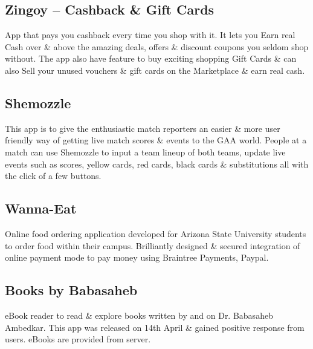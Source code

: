 \documentclass[]{deedy-resume-openfont}
\begin{document}
\begin{minipage}[t]{0.66\textwidth}
\sectionsep

\subsection{Zingoy – Cashback \& Gift Cards}
App that pays you cashback every time you shop with it. It lets you Earn real Cash over \& above the amazing deals, offers \& discount coupons you seldom shop without. The app also have feature to buy exciting shopping Gift Cards \& can also Sell your unused vouchers \& gift cards on the Marketplace \& earn real cash.
\sectionsep

\subsection{Shemozzle}
This app is to give the enthusiastic match reporters an easier \& more user friendly way of getting live match scores \& events to the GAA world. People at a match can use Shemozzle to input a team lineup of both teams, update live events such as scores, yellow cards, red cards, black cards \& substitutions all with the click of a few buttons.
\sectionsep

\subsection{Wanna-Eat}
Online food ordering application developed for Arizona State University students to order food within their campus. Brilliantly designed \& secured integration of online payment mode to pay money using Braintree Payments, Paypal.
\sectionsep

\subsection{Books by Babasaheb}
eBook reader to read \& explore books written by and on Dr. Babasaheb Ambedkar. This app was released on 14th April \& gained positive response from users. eBooks are provided from server.
\sectionsep


\end{minipage}
\end{document}
